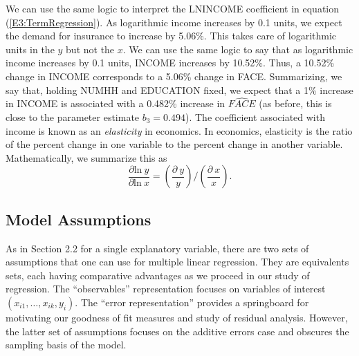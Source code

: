 

\noindent We can use the same logic to interpret the LNINCOME
coefficient in equation (\ref{E3:TermRegression}). As logarithmic
income increases by 0.1 units, we expect the demand for insurance to
increase by 5.06\%. This takes care of logarithmic units in the $y$
but not the $x$. We can use the same logic to say that as
logarithmic income increases by 0.1 units, INCOME increases by
10.52\%. Thus, a 10.52\% change in INCOME corresponds to a 5.06\%
change in FACE. Summarizing, we say that, holding NUMHH and
EDUCATION fixed, we expect that a 1\% increase in INCOME is
associated with a 0.482\% increase in $\widehat{FACE}$ (as before,
this is close to the parameter estimate $b_3 = 0.494$). The
coefficient associated with income is known as an \emph{elasticity}
in economics. In economics, elasticity is the ratio of the percent
change in one variable to the percent change in another variable.
Mathematically, we summarize this as
\begin{equation*}
\frac{\partial \textrm{ln} ~y}{\partial \textrm{ln} ~x} =
\left(\frac{\partial ~y}{y}\right)/\left(\frac{\partial
~x}{x}\right).
\end{equation*}

\subsection{Model Assumptions}

As in Section 2.2 for a single explanatory variable, there are two
sets of assumptions that one can use for multiple linear regression.
They are equivalents sets, each having comparative advantages as we
proceed in our study of regression. The ``observables''
representation focuses on variables of interest
$(x_{i1},\ldots,x_{ik},y_i).$ The ``error representation'' provides
a springboard for motivating our goodness of fit measures and study
of residual analysis. However, the latter set of assumptions focuses
on the additive errors case and obscures the sampling basis of the
model.



